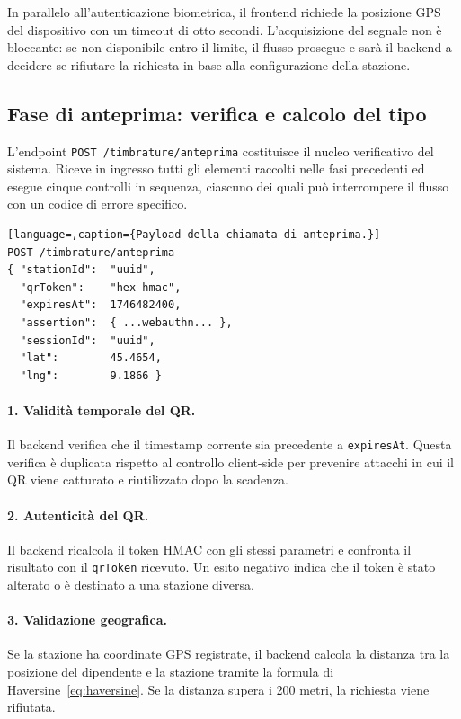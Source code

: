 In parallelo all'autenticazione biometrica, il frontend richiede la
posizione \textsc{GPS} del dispositivo con un timeout di otto secondi.
L'acquisizione del segnale non è bloccante: se non disponibile entro
il limite, il flusso prosegue e sarà il backend a decidere se rifiutare
la richiesta in base alla configurazione della stazione.

\subsection{Fase di anteprima: verifica e calcolo del tipo}
\label{subsec:anteprima}

L'endpoint \texttt{POST /timbrature/anteprima} costituisce il nucleo
verificativo del sistema. Riceve in ingresso tutti gli elementi raccolti
nelle fasi precedenti ed esegue cinque controlli in sequenza, ciascuno
dei quali può interrompere il flusso con un codice di errore specifico.

\begin{lstlisting}[language=,caption={Payload della chiamata di anteprima.}]
POST /timbrature/anteprima
{ "stationId":  "uuid",
  "qrToken":    "hex-hmac",
  "expiresAt":  1746482400,
  "assertion":  { ...webauthn... },
  "sessionId":  "uuid",
  "lat":        45.4654,
  "lng":        9.1866 }
\end{lstlisting}

\paragraph{1. Validità temporale del QR.}
Il backend verifica che il timestamp corrente sia precedente a
\texttt{expiresAt}. Questa verifica è duplicata rispetto al controllo
client-side per prevenire attacchi in cui il QR viene catturato e
riutilizzato dopo la scadenza.

\paragraph{2. Autenticità del QR.}
Il backend ricalcola il token \textsc{HMAC} con gli stessi parametri
e confronta il risultato con il \texttt{qrToken} ricevuto. Un esito
negativo indica che il token è stato alterato o è destinato a una
stazione diversa.

\paragraph{3. Validazione geografica.}
Se la stazione ha coordinate \textsc{GPS} registrate, il backend
calcola la distanza tra la posizione del dipendente e la stazione
tramite la formula di Haversine~\eqref{eq:haversine}. Se la distanza
supera i 200 metri, la richiesta viene rifiutata.

